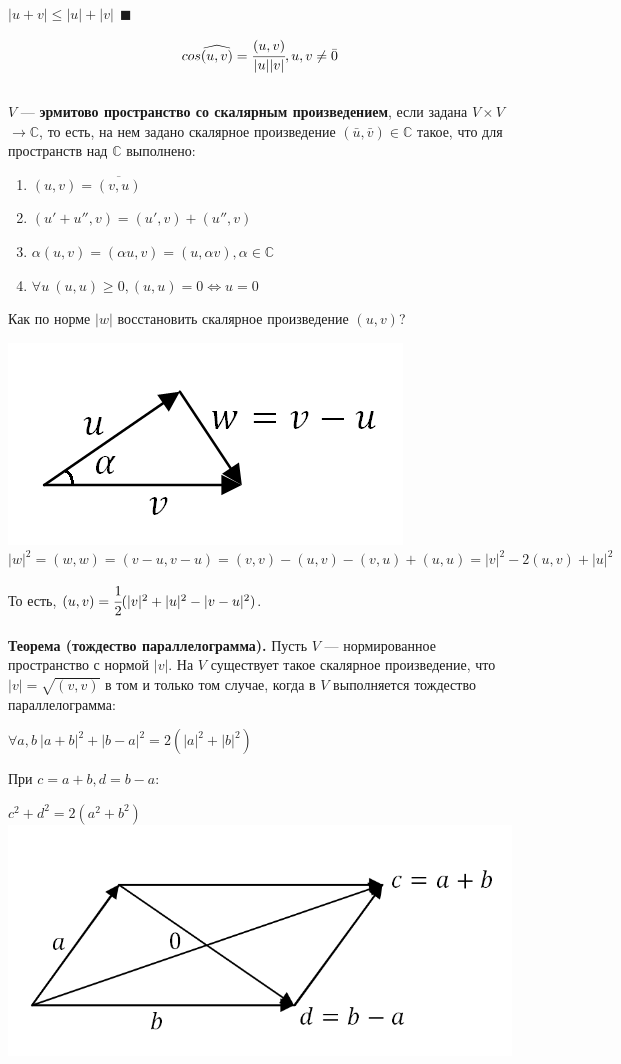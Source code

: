 \documentclass[a4paper,12pt]{article}
\begin{document}
\begin{defintion}
\begin{center}
	$|u+v| \leqslant |u|+|v| ~~\blacksquare$\end{center}
$$cos \widehat{(u, v)} = \cfrac{(u, v)}{|u||v|}, u, v \neq \bar 0$$\\
$V$ --- \textbf{эрмитово пространство со скалярным произведением}, если задана $V \times V$ $\rightarrow \mathbb{C}$, то есть, на нем задано скалярное произведение $(\bar u, \bar v) \in \mathbb{C}$ такое, что для пространств над $\mathbb{C}$ выполнено:\begin{enumerate}
	\item $(u, v) = \overline{(v, u)}$
	\item $(u'+u'', v) = (u', v)+(u'', v)$
	\item $\alpha (u, v) = (\alpha u, v) = (u, \alpha v), \alpha \in \mathbb{C}$
	\item $\forall u~ (u, u) \geqslant 0, (u, u) = 0 \Leftrightarrow u=0$
\end{enumerate}
Как по норме $|w|$ восстановить скалярное произведение $(u, v)$?
\begin{center}\includegraphics[scale=0.55]{l5_10.png}\\
	$|w|^2 = (w, w) = (v-u, v-u) = (v, v) - (u, v) - (v, u) + (u, u) = |v|^2 - 2(u, v) + |u|^2$\end{center}
То есть, $(u, v) = \cfrac{1}{2}(|v|^2 + |u|^2 - |v-u|^2)$.\\
\\
\textbf{Теорема (тождество параллелограмма).}
Пусть $V$ --- нормированное пространство с нормой $|v|$. На $V$ существует такое скалярное произведение, что $|v| = \sqrt{(v, v)}$ в том и только том случае, когда в $V$ выполняется тождество параллелограмма:\begin{center}
	$\forall a, b~ |a+b|^2 + |b-a|^2 = 2(|a|^2 + |b|^2)$\end{center}
При $c = a+b, d = b-a:$ \begin{center}$c^2+d^2 = 2(a^2+b^2)$\\
	\includegraphics[scale=0.55]{l5_11.png}\end{center}

\end{defintion}
\end{document}
